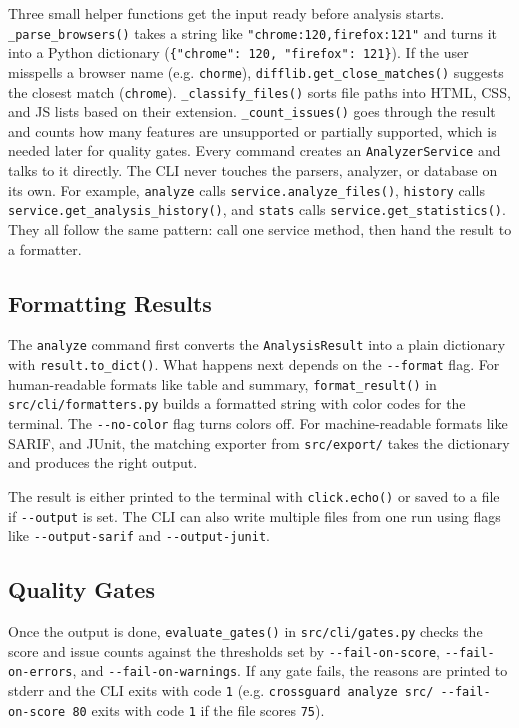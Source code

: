 Three small helper functions get the input ready before analysis starts. \texttt{\_parse\_browsers()} takes a string like \texttt{"chrome:120,firefox:121"} and turns it into a Python dictionary (\texttt{\{"chrome": 120, "firefox": 121\}}). If the user misspells a browser name (e.g. \texttt{chorme}), \texttt{difflib.get\_close\_matches()} suggests the closest match (\texttt{chrome}). \texttt{\_classify\_files()} sorts file paths into HTML, CSS, and JS lists based on their extension. \texttt{\_count\_issues()} goes through the result and counts how many features are unsupported or partially supported, which is needed later for quality gates. Every command creates an \texttt{AnalyzerService} and talks to it directly. The CLI never touches the parsers, analyzer, or database on its own. For example, \texttt{analyze} calls \texttt{service.analyze\_files()}, \texttt{history} calls \texttt{service.get\_analysis\_history()}, and \texttt{stats} calls \texttt{service.get\_statistics()}. They all follow the same pattern: call one service method, then hand the result to a formatter.

\subsection{Formatting Results}

The \texttt{analyze} command first converts the \texttt{AnalysisResult} into a plain dictionary with \texttt{result.to\_dict()}. What happens next depends on the \texttt{-{}-format} flag. For human-readable formats like table and summary, \texttt{format\_result()} in \texttt{src/cli/formatters.py} builds a formatted string with color codes for the terminal. The \texttt{-{}-no-color} flag turns colors off. For machine-readable formats like SARIF, and JUnit, the matching exporter from \texttt{src/export/} takes the dictionary and produces the right output.

The result is either printed to the terminal with \texttt{click.echo()} or saved to a file if \texttt{-{}-output} is set. The CLI can also write multiple files from one run using flags like \texttt{-{}-output-sarif} and \texttt{-{}-output-junit}.

\subsection{Quality Gates}

Once the output is done, \texttt{evaluate\_gates()} in \texttt{src/cli/gates.py} checks the score and issue counts against the thresholds set by \texttt{-{}-fail-on-score}, \texttt{-{}-fail-on-errors}, and \texttt{-{}-fail-on-warnings}. If any gate fails, the reasons are printed to stderr and the CLI exits with code \texttt{1} (e.g. \texttt{crossguard analyze src/ -{}-fail-on-score 80} exits with code \texttt{1} if the file scores \texttt{75}).

